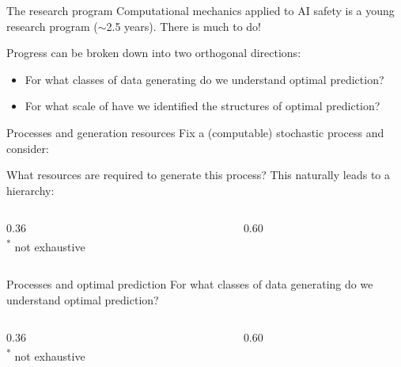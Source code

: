 \documentclass[aspectratio=169,12pt,t]{beamer}
\begin{document}
\begin{frame}{The research program}
  Computational mechanics applied to AI safety is a young research program
  ($\sim$2.5 years). There is much to do!

  Progress can be broken down into two orthogonal directions:
  \vspace{2mm}

  \begin{itemize}
    \setlength{\itemsep}{3mm}
    \item For what classes of data generating  do we
      understand optimal prediction?
    \item For what scale of  have we identified the
      structures of optimal prediction?
  \end{itemize}
\end{frame}

\begin{frame}{Processes and generation resources}
  Fix a (computable) stochastic process and consider:

  What resources are required to generate this process? This naturally leads
  to a hierarchy:
  \begin{columns}[T,onlytextwidth]
    \begin{column}{0.36\textwidth}
      \centering\resizebox{!}{38mm}{}\\[1mm]
      {\footnotesize \textsuperscript{*} not exhaustive}
    \end{column}
    \begin{column}{0.60\textwidth}
      \vspace{4mm}
      {\small}
    \end{column}
  \end{columns}
\end{frame}

\begin{frame}{Processes and optimal prediction}
  For what classes of data generating  do we understand
  optimal prediction?
  \begin{columns}[T,onlytextwidth]
    \begin{column}{0.36\textwidth}
      \centering\resizebox{!}{42mm}{}\\[1mm]
      {\footnotesize \textsuperscript{*} not exhaustive}
    \end{column}
    \begin{column}{0.60\textwidth}
      \vspace{4mm}
      {\small}
    \end{column}
  \end{columns}
\end{frame}
\end{document}

